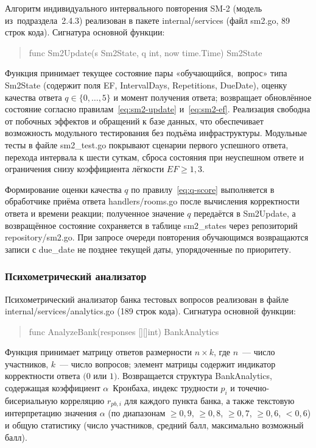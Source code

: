 Алгоритм индивидуального интервального повторения SM-2 (модель
из~подраздела~2.4.3) реализован в пакете internal/services
(файл sm2.go, 89 строк кода). Сигнатура основной функции:

\begin{quote}
func Sm2Update(s Sm2State, q int, now time.Time) Sm2State
\end{quote}

Функция принимает текущее состояние пары «обучающийся,~вопрос»
типа Sm2State (содержит поля EF,
IntervalDays, Repetitions, DueDate),
оценку качества ответа $q \in \{0, \ldots, 5\}$ и момент
получения ответа; возвращает обновлённое состояние согласно
правилам~\eqref{eq:sm2-update} и~\eqref{eq:sm2-ef}. Реализация
свободна от побочных эффектов и обращений к базе данных, что
обеспечивает возможность модульного тестирования без подъёма
инфраструктуры. Модульные тесты в файле sm2\_test.go
покрывают сценарии первого успешного ответа, перехода интервала
к шести суткам, сброса состояния при неуспешном ответе и
ограничения снизу коэффициента лёгкости $EF \geq 1{,}3$.

Формирование оценки качества $q$ по правилу~\eqref{eq:q-score}
выполняется в обработчике приёма ответа handlers/rooms.go
после вычисления корректности ответа и времени реакции; полученное
значение $q$ передаётся в Sm2Update, а возвращённое
состояние сохраняется в таблице sm2\_states через
репозиторий repository/sm2.go. При запросе очереди
повторения обучающимся возвращаются записи с due\_date
не позднее текущей даты, упорядоченные по приоритету.

\subsubsection{Психометрический анализатор}

Психометрический анализатор банка тестовых вопросов реализован
в файле internal/services/analytics.go (189 строк кода).
Сигнатура основной функции:

\begin{quote}
func AnalyzeBank(responses [][]int) BankAnalytics
\end{quote}

Функция принимает матрицу ответов размерности $n \times k$, где
$n$~--- число участников, $k$~--- число вопросов; элемент матрицы
содержит индикатор корректности ответа $(0$ или $1)$. Возвращается
структура BankAnalytics, содержащая коэффициент
$\alpha$~Кронбаха, индекс трудности $p_i$ и точечно-бисериальную
корреляцию $r_{pb,i}$ для каждого пункта банка, а также текстовую
интерпретацию значения $\alpha$ (по диапазонам $\geq 0{,}9$,
$\geq 0{,}8$, $\geq 0{,}7$, $\geq 0{,}6$, $< 0{,}6$) и общую
статистику (число участников, средний балл, максимально возможный
балл).


